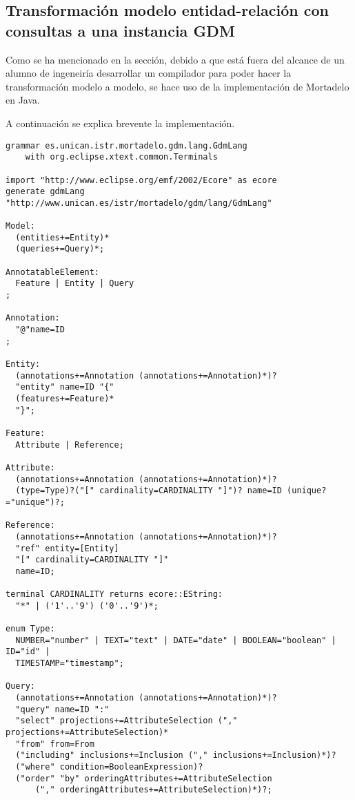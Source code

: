 \subsection{Transformación modelo entidad-relación con consultas a una instancia GDM}
Como se ha mencionado en la sección, debido a que está fuera del alcance de un alumno de ingeneiría desarrollar un compilador para poder hacer la transformación modelo a modelo, se hace uso de la implementación de Mortadelo en Java. 


A continuación se explica brevente la implementación.

\begin{code}
    \label{code:mortadelo-gdm-grammar}
    \begin{verbatim}
grammar es.unican.istr.mortadelo.gdm.lang.GdmLang
    with org.eclipse.xtext.common.Terminals

import "http://www.eclipse.org/emf/2002/Ecore" as ecore
generate gdmLang "http://www.unican.es/istr/mortadelo/gdm/lang/GdmLang"

Model:
  (entities+=Entity)*
  (queries+=Query)*;

AnnotatableElement:
  Feature | Entity | Query
;

Annotation:
  "@"name=ID
;

Entity:
  (annotations+=Annotation (annotations+=Annotation)*)?
  "entity" name=ID "{"
  (features+=Feature)*
  "}";

Feature:
  Attribute | Reference;

Attribute:
  (annotations+=Annotation (annotations+=Annotation)*)?
  (type=Type)?("[" cardinality=CARDINALITY "]")? name=ID (unique?="unique")?;

Reference:
  (annotations+=Annotation (annotations+=Annotation)*)?
  "ref" entity=[Entity]
  "[" cardinality=CARDINALITY "]"
  name=ID;

terminal CARDINALITY returns ecore::EString:
  "*" | ('1'..'9') ('0'..'9')*;

enum Type:
  NUMBER="number" | TEXT="text" | DATE="date" | BOOLEAN="boolean" | ID="id" |
  TIMESTAMP="timestamp";

Query:
  (annotations+=Annotation (annotations+=Annotation)*)?
  "query" name=ID ":"
  "select" projections+=AttributeSelection ("," projections+=AttributeSelection)*
  "from" from=From
  ("including" inclusions+=Inclusion ("," inclusions+=Inclusion)*)?
  ("where" condition=BooleanExpression)?
  ("order" "by" orderingAttributes+=AttributeSelection
      ("," orderingAttributes+=AttributeSelection)*)?;


\end{verbatim}
\end{code}

